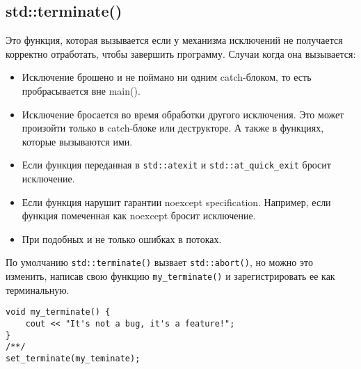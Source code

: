 \subsection{std::terminate()}

Это функция, которая вызывается если у механизма исключений не получается корректно отработать, чтобы завершить программу.
Случаи когда она вызывается:
\begin{itemize}
\item Исключение брошено и не поймано ни одним catch-блоком, то есть пробрасывается вне main().
\item Исключение бросается во время обработки другого исключения. Это может произойти только в catch-блоке или деструкторе. А также в функциях, которые вызываются ими. %
\item Если функция переданная в \texttt{std::atexit} и \texttt{std::at_quick_exit} бросит исключение.
\item Если функция нарушит гарантии noexcept specification. Например, если функция помеченная как noexcept бросит исключение.
\item При подобных и не только ошибках в потоках. %
\end{itemize}

По умолчанию \texttt{std::terminate()} вызвает \texttt{std::abort()}, но можно это изменить, написав свою функцию \texttt{my_terminate()} и зарегистрировать ее как терминальную. %
\begin{verbatim}
void my_terminate() {
    cout << "It's not a bug, it's a feature!";
}
/**/
set_terminate(my_teminate);
\end{verbatim}
